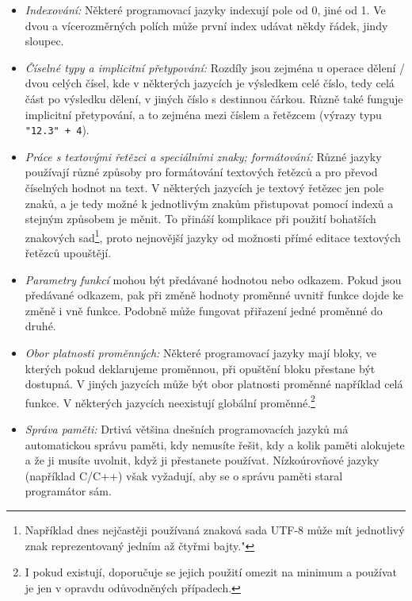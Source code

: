 \documentclass[a4paper,11pt,twoside]{article}
\def\code#1{\textnormal{\texttt{#1}}}
\theoremstyle{red}
\theoremstyle{green}
\begin{document}
        \begin{itemize}
            \item \emph{Indexování:} Některé programovací jazyky indexují pole od 0, jiné od 1. Ve dvou a vícerozměrných polích může první index udávat někdy řádek, jindy sloupec.
            \item \emph{Číselné typy a implicitní přetypování:} Rozdíly jsou zejména u operace dělení / dvou celých čísel, kde v některých jazycích je výsledkem celé číslo, tedy celá část po výsledku dělení, v jiných číslo s destinnou čárkou.
            Různě také funguje implicitní přetypování, a to zejména mezi číslem a řetězcem (výrazy typu \code{"12.3"{} + 4}).
            \item \emph{Práce s textovými řetězci a speciálními znaky; formátování:} Různé jazyky používají různé způsoby pro formátování textových řetězců a pro převod číselných hodnot na text.
            V některých jazycích je textový řetězec jen pole znaků, a je tedy možné k jednotlivým znakům přistupovat pomocí indexů a stejným způsobem je měnit.
            To přináší komplikace při použití bohatších znakových sad\footnote{Například dnes nejčastěji používaná znaková sada UTF-8 může mít jednotlivý znak reprezentovaný jedním až čtyřmi bajty."}, proto nejnovější jazyky od možnosti přímé editace textových řetězců upouštějí.
            \item \emph{Parametry funkcí} mohou být předávané hodnotou nebo odkazem. 
            Pokud jsou předávané odkazem, pak při změně hodnoty proměnné uvnitř funkce dojde ke změně i vně funkce.
            Podobně může fungovat přiřazení jedné proměnné do druhé.
            \item \emph{Obor platnosti proměnných:} Některé programovací jazyky mají bloky, ve kterých pokud deklarujeme proměnnou, při opuštění bloku přestane být dostupná.
            V jiných jazycích může být obor platnosti proměnné například celá funkce.
            V některých jazycích neexistují globální proměnné.\footnote{I pokud existují, doporučuje se jejich použití omezit na minimum a používat je jen v opravdu odůvodněných případech.}
            \item \emph{Správa paměti:} Drtivá většina dnešních programovacích jazyků má automatickou správu paměti, kdy nemusíte řešit, kdy a kolik paměti alokujete a že ji musíte uvolnit, když ji přestanete používat.
            Nízkoúrovňové jazyky (například C/C++) však vyžadují, aby se o správu paměti staral programátor sám.
        \end{itemize}
\end{document}
